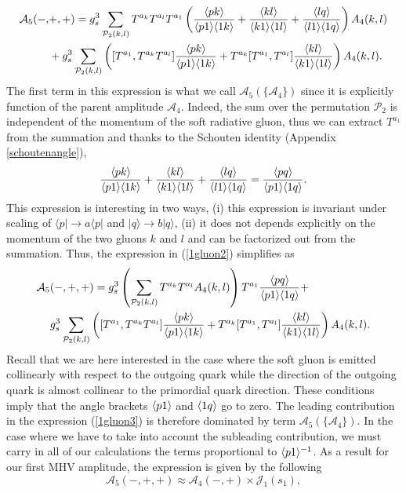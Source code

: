 \begin{align}
\mathcal{A}_5(-,& +,+) =g^3_s \sum_{\mathcal{P}_2(k,l)} T^{a_k}T^{a_l}T^{a_1} \left( \frac{\langle p k\rangle}{\langle p 1\rangle \langle1 k\rangle} + \frac{\langle k l\rangle}{\langle k 1\rangle \langle1 l\rangle} + \frac{\langle l q\rangle}{\langle l 1\rangle \langle1 q\rangle} \right)A_4(k,l) \nonumber \\ 
& +g^3_s \sum_{\mathcal{P}_2(k,l)} \left( [T^{a_1},T^{a_k}T^{a_l}]  \frac{\langle p k\rangle}{\langle p 1\rangle \langle1 k\rangle}+T^{a_k}[T^{a_1},T^{a_l}] \frac{\langle k l\rangle}{\langle k 1\rangle \langle1 l\rangle}  \right) A_4(k,l).
\label{1gluon2}
\end{align}
The first term in this expression is what we call $\mathcal{A}_5(\{\mathcal{A}_4\})$ since it is explicitly function of the parent amplitude $\mathcal{A}_4$. Indeed, the sum over the permutation $\mathcal{P}_2$ is independent of the momentum of the soft radiative gluon, thus we can extract $T^{a_1}$ from the summation and thanks to the Schouten identity (Appendix \ref{schoutenangle}), 
\begin{equation}
\frac{\langle p k\rangle}{\langle p 1\rangle \langle1 k\rangle} + \frac{\langle k l\rangle}{\langle k 1\rangle \langle1 l\rangle} + \frac{\langle l q\rangle}{\langle l 1\rangle \langle1 q\rangle}=\frac{\langle p q\rangle}{\langle p 1\rangle \langle1 q\rangle}.
\end{equation}  
This expression is interesting in two ways, (i) this expression is invariant under scaling of $\langle p\vert \rightarrow a \langle p\vert$ and $\vert q \rangle \rightarrow b \vert q \rangle$, (ii) it does not depends explicitly on the momentum of the two gluons $k$ and $l$ and can be factorized out from the summation. Thus, the expression in (\ref{1gluon2}) simplifies as
\begin{align}
\mathcal{A}_5 &(-,+,+) =g^3_s \left( \sum_{\mathcal{P}_2(k,l)} T^{a_k}T^{a_l}A_4(k,l) \right) T^{a_1} \frac{\langle p q\rangle}{\langle p 1\rangle \langle1 q\rangle}+ \nonumber \\ 
& g^3_s \sum_{\mathcal{P}_2(k,l)} \left( [T^{a_1},T^{a_k}T^{a_l}]  \frac{\langle p k\rangle}{\langle p 1\rangle \langle1 k\rangle}+T^{a_k}[T^{a_1},T^{a_l}] \frac{\langle k l\rangle}{\langle k 1\rangle \langle1 l\rangle}  \right) A_4(k,l).
\label{1gluon3}
\end{align}
Recall that we are here interested in the case where the soft gluon is emitted collinearly with respect to the outgoing quark while the direction of the outgoing quark is almost collinear to the primordial quark direction. These conditions imply that the angle brackets $\langle p1\rangle$ and $\langle1q\rangle$ go to zero. The leading contribution in the expression (\ref{1gluon3}) is therefore dominated by term $\mathcal{A}_5(\{\mathcal{A}_4\})$. In the case where we have to take into account the subleading contribution, we must carry in all of our calculations the terms proportional to $\langle p1\rangle^{-1}$. As a result for our first MHV amplitude, the expression is given by the following
\begin{equation}
\mathcal{A}_5(-,+,+) \approx \mathcal{A}_4(-,+) \times \mathcal{J}_1(s_1),
\label{Amp1gluon}
\end{equation}
